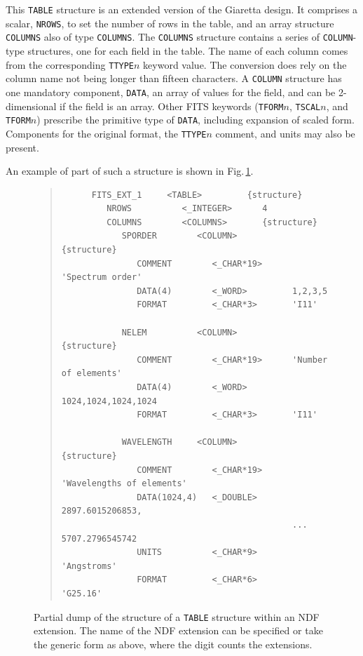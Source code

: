 \documentclass[final,authoryear,5p,times,twocolumn]{elsarticle}
\begin{document}
This \texttt{TABLE} structure is an extended version of the Giaretta
design. It comprises a scalar, \texttt{NROWS}, to set the number of
rows in the table, and an array structure \texttt{COLUMNS} also of
type \texttt{COLUMNS}.  The \texttt{COLUMNS} structure contains a
series of \texttt{COLUMN}-type structures, one for each field in the
table. The name of each column comes from the corresponding
\texttt{TTYPE$n$} keyword value.  The conversion does rely on the
column name not being longer than fifteen characters.  A
\texttt{COLUMN} structure has one mandatory component, \texttt{DATA},
an array of values for the field, and can be 2-dimensional if the
field is an array.  Other FITS keywords (\texttt{TFORM$n$},
\texttt{TSCAL$n$}, and \texttt{TFORM$n$}) prescribe the primitive type
of \texttt{DATA}, including expansion of scaled form. Components for
the original format, the \texttt{TTYPE$n$} comment, and units may also
be present.

An example of part of such a structure is shown in
Fig.\,\ref{fig:hdstable}.

\begin{figure}[t]
\begin{minipage}{\textwidth}
\begin{quote}
\small
\begin{verbatim}
      FITS_EXT_1     <TABLE>         {structure}
         NROWS          <_INTEGER>      4
         COLUMNS        <COLUMNS>       {structure}
            SPORDER        <COLUMN>        {structure}
               COMMENT        <_CHAR*19>      'Spectrum order'
               DATA(4)        <_WORD>         1,2,3,5
               FORMAT         <_CHAR*3>       'I11'

            NELEM          <COLUMN>        {structure}
               COMMENT        <_CHAR*19>      'Number of elements'
               DATA(4)        <_WORD>         1024,1024,1024,1024
               FORMAT         <_CHAR*3>       'I11'

            WAVELENGTH     <COLUMN>        {structure}
               COMMENT        <_CHAR*19>      'Wavelengths of elements'
               DATA(1024,4)   <_DOUBLE>       2897.6015206853,
                                              ... 5707.2796545742
               UNITS          <_CHAR*9>       'Angstroms'
               FORMAT         <_CHAR*6>       'G25.16'
\end{verbatim}
\end{quote}
\caption{Partial dump of the structure of a \texttt{TABLE} structure
within an NDF extension.  The name of the NDF extension can be specified
or take the generic form as above, where the digit counts the extensions.}
\label{fig:hdstable}
\end{minipage}
\end{figure}
\end{document}
